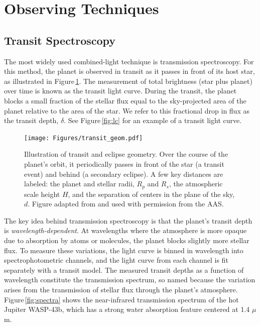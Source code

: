 \documentclass[graybox,natbib,nosecnum]{svmult}
\begin{document}

\section{Observing Techniques} 

\subsection{Transit Spectroscopy}
The most widely used combined-light technique is transmission spectroscopy. For this method, the planet is observed in transit as it passes in front of its host star, as illustrated in Figure\,\ref{fig:geom}.  The measurement of total brightness (star plus planet) over time is known as the transit light curve.  During the transit, the planet blocks a small fraction of the stellar flux equal to the sky-projected area of the planet relative to the area of the star. We refer to this fractional drop in flux as the transit depth, $\delta$. See Figure\,\ref{fig:lc} for an example of a transit light curve.

\begin{figure}
\begin{centering}
\texttt{[image: Figures/transit\_geom.pdf]}
\caption{Illustration of transit and eclipse geometry. Over the course of the planet's orbit, it periodically passes in front of the star (a transit event) and behind (a secondary eclipse). A few key distances are labeled: the planet and stellar radii, $R_p$ and $R_s$, the atmospheric scale height $H$, and the separation of centers in the plane of the sky, $d$. Figure adapted from \citealt{robinson17} and used with permission from the AAS.}
\label{fig:geom}       
\end{centering}
\end{figure}

The key idea behind transmission spectroscopy is that the planet's transit depth is \emph{wavelength-dependent}.  At wavelengths where the atmosphere is more opaque due to absorption by atoms or molecules, the planet blocks slightly more stellar flux.  To measure these variations, the light curve is binned in wavelength into spectrophotometric channels, and the light curve from each channel is fit separately with a transit model.  The measured transit depths as a function of wavelength constitute the transmission spectrum, so named because the variation arises from the transmission of stellar flux through the planet's atmosphere. Figure\,\ref{fig:spectra} shows the near-infrared transmission spectrum of the hot Jupiter WASP-43b, which has a strong water absorption feature centered at 1.4 $\mu$m. 
 
\end{document}
